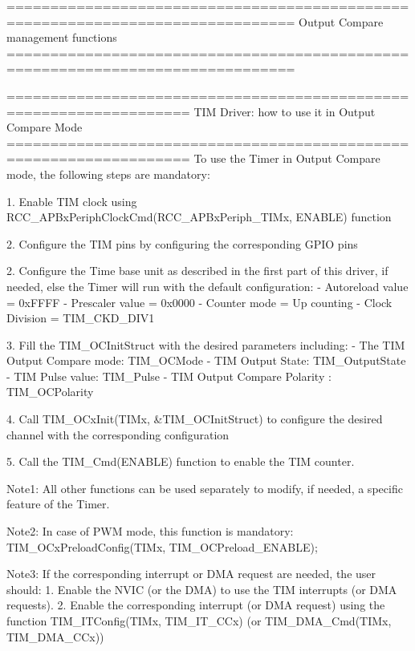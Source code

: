\begin{DoxyVerb} ===============================================================================
                        Output Compare management functions
 ===============================================================================  
   
       ===================================================================      
              TIM Driver: how to use it in Output Compare Mode
       =================================================================== 
       To use the Timer in Output Compare mode, the following steps are mandatory:
       
       1. Enable TIM clock using RCC_APBxPeriphClockCmd(RCC_APBxPeriph_TIMx, ENABLE) function
       
       2. Configure the TIM pins by configuring the corresponding GPIO pins
       
       2. Configure the Time base unit as described in the first part of this driver, 
          if needed, else the Timer will run with the default configuration:
          - Autoreload value = 0xFFFF
          - Prescaler value = 0x0000
          - Counter mode = Up counting
          - Clock Division = TIM_CKD_DIV1
          
       3. Fill the TIM_OCInitStruct with the desired parameters including:
          - The TIM Output Compare mode: TIM_OCMode
          - TIM Output State: TIM_OutputState
          - TIM Pulse value: TIM_Pulse
          - TIM Output Compare Polarity : TIM_OCPolarity
       
       4. Call TIM_OCxInit(TIMx, &TIM_OCInitStruct) to configure the desired channel with the 
          corresponding configuration
       
       5. Call the TIM_Cmd(ENABLE) function to enable the TIM counter.
       
       Note1: All other functions can be used separately to modify, if needed,
              a specific feature of the Timer. 
          
       Note2: In case of PWM mode, this function is mandatory:
              TIM_OCxPreloadConfig(TIMx, TIM_OCPreload_ENABLE); 
              
       Note3: If the corresponding interrupt or DMA request are needed, the user should:
                1. Enable the NVIC (or the DMA) to use the TIM interrupts (or DMA requests). 
                2. Enable the corresponding interrupt (or DMA request) using the function 
                   TIM_ITConfig(TIMx, TIM_IT_CCx) (or TIM_DMA_Cmd(TIMx, TIM_DMA_CCx))   \end{DoxyVerb}
 

